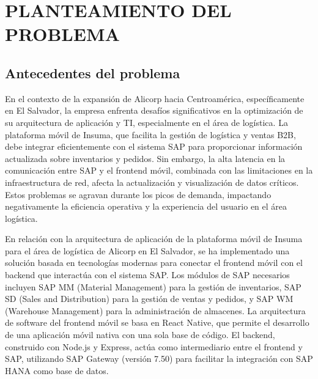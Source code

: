 \section{PLANTEAMIENTO DEL PROBLEMA }
\subsection{Antecedentes del problema}

En el contexto de la expansión de Alicorp hacia Centroamérica, específicamente en El Salvador, la empresa enfrenta desafíos significativos en la optimización de su arquitectura de aplicación y TI, especialmente en el área de logística. La plataforma móvil de Insuma, que facilita la gestión de logística y ventas B2B, debe integrar eficientemente con el sistema SAP para proporcionar información actualizada sobre inventarios y pedidos. Sin embargo, la alta latencia en la comunicación entre SAP y el frontend móvil, combinada con las limitaciones en la infraestructura de red, afecta la actualización y visualización de datos críticos. Estos problemas se agravan durante los picos de demanda, impactando negativamente la eficiencia operativa y la experiencia del usuario en el área logística.

En relación con la arquitectura de aplicación de la plataforma móvil de Insuma para el área de logística de Alicorp en El Salvador, se ha implementado una solución basada en tecnologías modernas para conectar el frontend móvil con el backend que interactúa con el sistema SAP. Los módulos de SAP necesarios incluyen SAP MM (Material Management) para la gestión de inventarios, SAP SD (Sales and Distribution) para la gestión de ventas y pedidos, y SAP WM (Warehouse Management) para la administración de almacenes. La arquitectura de software del frontend móvil se basa en React Native, que permite el desarrollo de una aplicación móvil nativa con una sola base de código. El backend, construido con Node.js y Express, actúa como intermediario entre el frontend y SAP, utilizando SAP Gateway (versión 7.50) para facilitar la integración con SAP HANA como base de datos.


